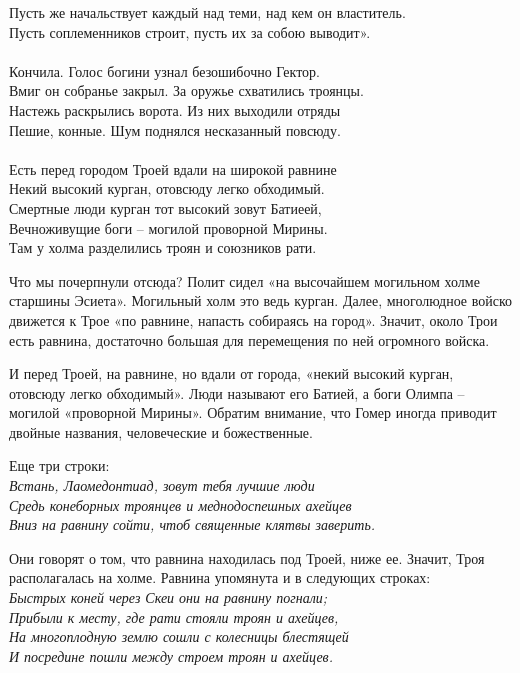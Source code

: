 {Пусть же начальствует каждый над теми, над кем он властитель.\\
Пусть соплеменников строит, пусть их за собою выводит».\\
\mbox{ }\\Кончила. Голос богини узнал безошибочно Гектор.\\
Вмиг он собранье закрыл. За оружье схватились троянцы.\\
Настежь раскрылись ворота. Из них выходили отряды\\
Пешие, конные. Шум поднялся несказанный повсюду.\\
\mbox{ }\\
Есть перед городом Троей вдали на широкой равнине\\
Некий высокий курган, отовсюду легко обходимый.\\
Смертные люди курган тот высокий зовут Батиеей,\\
Вечноживущие боги – могилой проворной Мирины.\\
Там у холма разделились троян и союзников рати.\\}

Что мы почерпнули отсюда? Полит сидел «на высочайшем могильном холме старшины Эсиета». Могильный холм это ведь курган. Далее, многолюдное войско движется к Трое «по равнине, напасть собираясь на город». Значит, около Трои есть равнина, достаточно большая для перемещения по ней огромного войска.

И перед Троей, на равнине, но вдали от города, «некий высокий курган, отовсюду легко обходимый». Люди называют его Батией, а боги Олимпа – могилой «проворной Мирины». Обратим внимание, что Гомер иногда приводит двойные названия, человеческие и божественные.

Еще три строки:\\

\noindent
\textit{Встань, Лаомедонтиад, зовут тебя лучшие люди\\
Средь конеборных троянцев и меднодоспешных ахейцев\\
Вниз на равнину сойти, чтоб священные клятвы заверить.\\}

Они говорят о том, что равнина находилась под Троей, ниже ее. Значит, Троя располагалась на холме. Равнина упомянута и в следующих строках:\\

\noindent
\textit{Быстрых коней через Скеи они на равнину погнали;\\
Прибыли к месту, где рати стояли троян и ахейцев,\\
На многоплодную землю сошли с колесницы блестящей\\
И посредине пошли между строем троян и ахейцев.\\}

